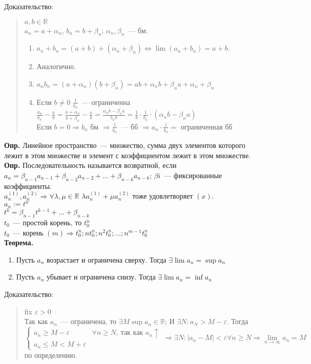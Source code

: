 \documentclass{article}
\begin{document}
	Доказательство:
	\begin{quote}
		$a, b \in \mathbb{R}$ \\
		$a_n = a + \alpha_n$, $b_n = b + \beta_n$; $\alpha_n, \beta_n$~--- бм. 
		\begin{enumerate}
			\item
			$a_n + b_n = (a + b) + (\alpha_n + \beta_n) \Leftrightarrow \lim (a_n + b_n) = a + b$.
			\item Аналогично.
			\item $a_nb_n = (a + \alpha_n)(b + \beta_n) = ab + \alpha_nb + \beta_na + \alpha_n + \beta_n$
			\item Если $b \not= 0$ $\frac{1}{b_n}$~--- ограниченна \\
			$\frac{a_n}{b_n} - \frac{a}{b} = \frac{a + \alpha_n}{b + \beta_n} - \frac{a}{b} = \frac{\alpha_nb - \beta_na}{b_nb} = \frac{1}{b} \cdot \frac{1}{b_n} \cdot (\alpha_nb - \beta_na)$ \\
			Если $b = 0 \Rightarrow b_n$ бм $\Rightarrow \frac{1}{b_n}$~--- бб $\Rightarrow a_n \cdot \frac{1}{b_n} =$ ограниченная бб
		\end{enumerate}
	\end{quote}
	\textbf{Опр.} Линейное пространство~--- множество, сумма двух элементов которого лежит в этом множестве и элемент с коэффициентом лежит в этом множестве. \\
	\textbf{Опр.} Последовательность называется возвратной, если $a_n = \beta_{n - 1} a_{n - 1} + \beta_{n - 2} a_{n - 2} + \dots + \beta_{n - k} a_{n - k}$; $\beta{i}$~--- фиксированные коэффициенты. \\
	$a_n^{(1)}, a_n^{(2)} \Rightarrow \forall \lambda, \mu \in \mathbb{R}$ $\lambda a_n^{(1)} + \mu a_n^{(2)}$ тоже удовлетворяет $(x)$. \\
	$a_n := t^n$ \\
	$t^k = \beta_{n - 1}t^{k - 1} + \dots + \beta_{n - k}$ \\
	$t_0$~--- простой корень, то $t_0^n$ \\
	$t_0$~--- корень $(m) \Rightarrow t_0^n; nt_0^n; n^2t_0^n; \dots; n^{m - 1}t_0^n$ \\
	\textbf{Теорема.}
	\begin{enumerate}
		\item Пусть $a_n$ возрастает и ограничена сверху. Тогда $\exists \lim a_n = \sup a_n$
		\item Пусть $a_n$ убывает и ограничена снизу. Тогда $\exists \lim a_n = \inf a_n$
	\end{enumerate}
	Доказательство:
	\begin{quote}
		fix $\varepsilon > 0$ \\
		Так как $a_n$~--- ограничена, то $\exists M  \sup a_n \in \mathbb{R}$; И $\exists N: a_N > M - \varepsilon$. Тогда $\begin{cases}
			a_n \geqslant M - \varepsilon & \forall n \geqslant N \text{, так как } a_n \uparrow \\
			a_n \leqslant M < M + \varepsilon
		\end{cases} \Rightarrow \exists N: |a_n - M| < \varepsilon \forall n \geqslant N \Rightarrow \lim\limits_{n \rightarrow \infty} a_n = M$ по определению.
	\end{quote}
\end{document}
